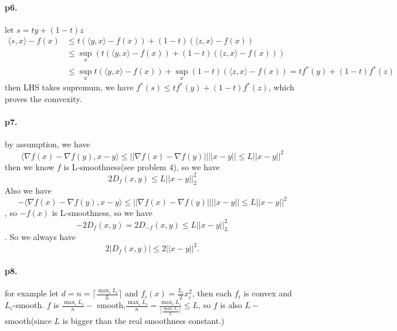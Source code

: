 \documentclass[8pt,a4paper]{article}
\begin{document}
	
\paragraph{p6.}let $s=ty+(1-t)z$
\begin{equation*}
	\begin{aligned}
	\langle s,x\rangle-f(x)&\leq t(\langle y,x\rangle-f(x))+(1-t)(\langle z,x\rangle-f(x))\\
	&\leq \sup_x\left(t(\langle y,x\rangle-f(x))+(1-t)(\langle z,x\rangle-f(x))\right)\\
	&\leq \sup_x t(\langle y,x\rangle-f(x))+\sup_x (1-t)(\langle z,x\rangle-f(x))=tf^*(y)+(1-t)f^*(z)
\end{aligned}
\end{equation*}
then LHS takes supremum, we have $f^*(s)\leq tf^*(y)+(1-t)f^*(z)$, which proves the comvexity.

	
\paragraph{p7.}
by assumption, we have \begin{equation*}
	\langle\nabla f(x)-\nabla f(y),x-y\rangle\leq ||\nabla f(x)-\nabla f(y)||||x-y||\leq L||x-y||^2
\end{equation*}
then we know $f$ is L-smoothness(see problem 4), so we have \begin{equation*}
	2D_f(x,y)\leq L||x-y||^2_2
\end{equation*}
Also we have 
 \begin{equation*}
	-\langle\nabla f(x)-\nabla f(y),x-y\rangle\leq ||\nabla f(x)-\nabla f(y)||||x-y||\leq L||x-y||^2
\end{equation*}, so $-f(x)$ is L-smoothness, so we have 
$$-2D_{f}(x,y)=2D_{-f}(x,y)\leq L||x-y||^2_L$$. So we always have
$$2|D_f(x,y)|\leq 2||x-y||^2.$$



\paragraph{p8.}
for example let $d=n=\lceil\frac{\max_i L_i}{L}\rceil$ and $f_i(x)=\frac{L_i}{2}x_i^2$, then each $f_i$ is convex and $L_i$-smooth. $f$ is $\frac{\max_i L_i}{n}-$ smooth,$\frac{\max_i L_i}{n}=\frac{\max_i L_i}{\lceil\frac{\max_i L_i}{L}\rceil }\leq L$, so $f$ is also $L-$smooth(since $L$ is bigger than the real smoothness constant.)
\end{document}
